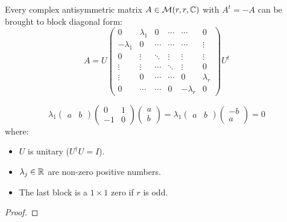 \begin{theorem}
Every complex antisymmetric matrix $A\in {\cal M}(r,r,{\Bbb C})$ with $%
A^{t}=-A$ can be brought to block diagonal form: 
\begin{equation}
A=U\left( 
\begin{array}{cccccc}
0 & \lambda _{1} & 0 & \cdots & \cdots & 0 \\ 
-\lambda _{1} & 0 & \cdots & \cdots & \cdots & \vdots \\ 
0 & \vdots & \ddots & \vdots & \vdots & \vdots \\ 
\vdots & \vdots & \cdots & \ddots & \vdots & 0 \\ 
\vdots & 0 & \cdots & \cdots & 0 & \lambda _{r} \\ 
0 & \cdots & \cdots & 0 & -\lambda _{r} & 0%
\end{array}%
\right) U^{t}
\end{equation}

\begin{remark}
\begin{equation}
\lambda _{1}\left( 
\begin{array}{cc}
a & b%
\end{array}%
\right) \left( 
\begin{array}{cc}
0 & 1 \\ 
-1 & 0%
\end{array}%
\right) \left( 
\begin{array}{c}
a \\ 
b%
\end{array}%
\right) =\lambda _{1}\left( 
\begin{array}{cc}
a & b%
\end{array}%
\right) \left( 
\begin{array}{c}
-b \\ 
a%
\end{array}%
\right) =0
\end{equation}%
where:
\end{remark}

\begin{itemize}
\item $U$ is unitary ($U^{\dagger }U=I$).

\item $\lambda _{j}\in {\Bbb R}$ are non-zero positive numbers.

\item The last block is a $1\times 1$ zero if $r$ is odd.
\end{itemize}

\begin{proof}


\end{proof}
\end{theorem}
